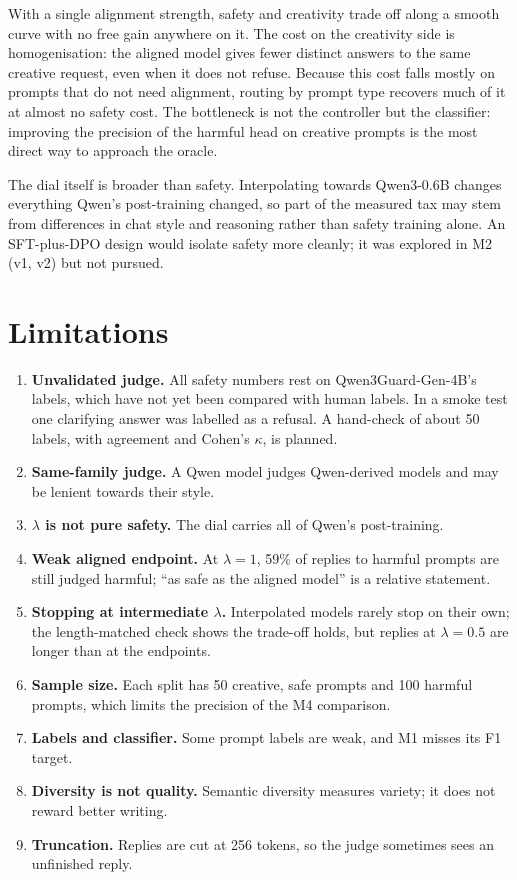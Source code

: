 \documentclass[11pt,a4paper]{article}
\newcommand{\lam}{\lambda}
\begin{document}
With a single alignment strength, safety and creativity trade off along a smooth curve with no free gain anywhere on it. The cost on the creativity side is homogenisation: the aligned model gives fewer distinct answers to the same creative request, even when it does not refuse. Because this cost falls mostly on prompts that do not need alignment, routing by prompt type recovers much of it at almost no safety cost. The bottleneck is not the controller but the classifier: improving the precision of the harmful head on creative prompts is the most direct way to approach the oracle.

The dial itself is broader than safety. Interpolating towards Qwen3-0.6B changes everything Qwen's post-training changed, so part of the measured tax may stem from differences in chat style and reasoning rather than safety training alone. An SFT-plus-DPO design would isolate safety more cleanly; it was explored in M2 (v1, v2) but not pursued.

\section{Limitations}
\label{sec:limits}

\begin{enumerate}
  \item \textbf{Unvalidated judge.} All safety numbers rest on Qwen3Guard-Gen-4B's labels, which have not yet been compared with human labels. In a smoke test one clarifying answer was labelled as a refusal. A hand-check of about 50 labels, with agreement and Cohen's $\kappa$, is planned.
  \item \textbf{Same-family judge.} A Qwen model judges Qwen-derived models and may be lenient towards their style.
  \item \textbf{$\lam$ is not pure safety.} The dial carries all of Qwen's post-training.
  \item \textbf{Weak aligned endpoint.} At $\lam=1$, 59\% of replies to harmful prompts are still judged harmful; ``as safe as the aligned model'' is a relative statement.
  \item \textbf{Stopping at intermediate $\lam$.} Interpolated models rarely stop on their own; the length-matched check shows the trade-off holds, but replies at $\lam=0.5$ are longer than at the endpoints.
  \item \textbf{Sample size.} Each split has 50 creative, safe prompts and 100 harmful prompts, which limits the precision of the M4 comparison.
  \item \textbf{Labels and classifier.} Some prompt labels are weak, and M1 misses its F1 target.
  \item \textbf{Diversity is not quality.} Semantic diversity measures variety; it does not reward better writing.
  \item \textbf{Truncation.} Replies are cut at 256 tokens, so the judge sometimes sees an unfinished reply.
\end{enumerate}
\end{document}
